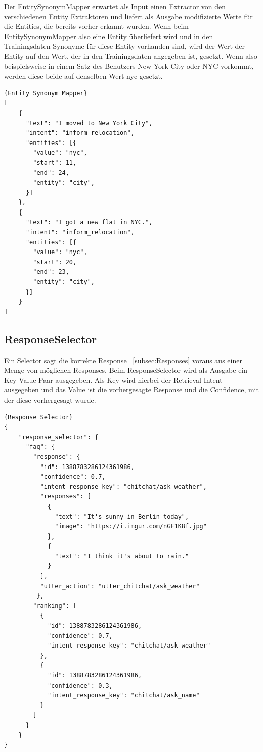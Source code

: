 Der EntitySynonymMapper erwartet als Input einen Extractor von den verschiedenen Entity Extraktoren und liefert als Ausgabe modifizierte Werte für die Entities, die bereits vorher erkannt wurden.
Wenn beim EntitySynonymMapper also eine Entity überliefert wird und in den Trainingsdaten Synonyme für diese Entity vorhanden sind, wird der Wert der Entity auf den Wert, der in den Trainingsdaten angegeben ist, gesetzt.
Wenn also beispielsweise in einem Satz des Benutzers New York City oder NYC vorkommt, werden diese beide auf denselben Wert nyc gesetzt.\cite{entitySynonymMapper}

\begin{lstlisting}[label={lst:entity-synonym-mapper},caption={Entity Synonym Mapper}]{Entity Synonym Mapper}
[
    {
      "text": "I moved to New York City",
      "intent": "inform_relocation",
      "entities": [{
        "value": "nyc",
        "start": 11,
        "end": 24,
        "entity": "city",
      }]
    },
    {
      "text": "I got a new flat in NYC.",
      "intent": "inform_relocation",
      "entities": [{
        "value": "nyc",
        "start": 20,
        "end": 23,
        "entity": "city",
      }]
    }
]
\end{lstlisting}

\subsection{ResponseSelector}\label{subsec:response-selector}

Ein Selector sagt die korrekte Response ~\ref{subsec:Responses} voraus aus einer Menge von möglichen Responses.
Beim ResponseSelector wird als Ausgabe ein Key-Value Paar ausgegeben.
Als Key wird hierbei der Retrieval Intent ausgegeben und das Value ist die vorhergesagte Response und die Confidence, mit der diese vorhergesagt wurde.\cite{responseSelector}

\begin{lstlisting}[label={lst:response-selector},caption={Response Classifier}]{Response Selector}
{
    "response_selector": {
      "faq": {
        "response": {
          "id": 1388783286124361986,
          "confidence": 0.7,
          "intent_response_key": "chitchat/ask_weather",
          "responses": [
            {
              "text": "It's sunny in Berlin today",
              "image": "https://i.imgur.com/nGF1K8f.jpg"
            },
            {
              "text": "I think it's about to rain."
            }
          ],
          "utter_action": "utter_chitchat/ask_weather"
         },
        "ranking": [
          {
            "id": 1388783286124361986,
            "confidence": 0.7,
            "intent_response_key": "chitchat/ask_weather"
          },
          {
            "id": 1388783286124361986,
            "confidence": 0.3,
            "intent_response_key": "chitchat/ask_name"
          }
        ]
      }
    }
}
\end{lstlisting}


